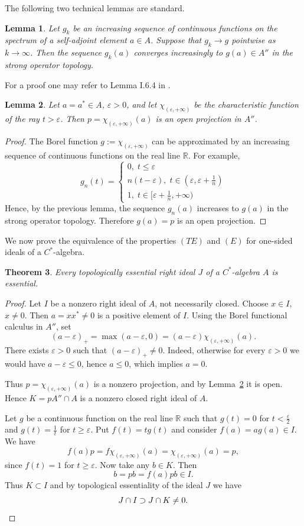\documentclass[reqno,a4paper,12pt]{amsart}
\theoremstyle{plain}
\newtheorem{theorem}{Theorem}[section]
\newtheorem{lemma}[theorem]{Lemma}
\theoremstyle{definition}
\newcommand{\RR}{\mathbb R}
\newcommand{\eps}{\varepsilon}
\renewcommand{\leq}{\leqslant}
\renewcommand{\geq}{\geqslant}
\begin{document}
	The following two technical lemmas are standard.
	\begin{lemma}
		Let $g_k$ be an increasing sequence of continuous functions on the spectrum of a self-adjoint element $a \in A$.
		Suppose that $g_k \to g$ pointwise as $k \to \infty$.
		Then the sequence $g_k(a)$ converges increasingly to $g(a) \in A''$ in the strong operator topology.
	\end{lemma}
	For a proof one may refer to Lemma I.6.4 in \cite{davidson}.
	\begin{lemma}
		\label{lem:proj}
		Let $a = a^* \in A$, $\eps > 0$, and let $\chi_{(\eps, +\infty)}$ be the characteristic function of the ray $t > \eps$.
		Then $p = \chi_{(\eps, +\infty)}(a)$ is an open projection in $A''$.
	\end{lemma}
	\begin{proof}
		The Borel function $g :=\chi_{(\eps, +\infty)}$ can be approximated by an increasing sequence of continuous functions on the real line $\RR$.
		For example,
		\[ g_n(t) = \begin{cases}
			0,\; t \leq \eps \\
			n(t - \eps),\; t \in (\eps, \eps + \frac 1n) \\
			1,\; t \in [\eps + \frac 1n, +\infty)
		\end{cases} \]
		Hence, by the previous lemma, the sequence $g_n(a)$ increases to $g(a)$ in the strong operator topology. Therefore $g(a) = p$ is an open projection.
	\end{proof}
	
	We now prove the equivalence of the properties $(TE)$ and $(E)$ for one-sided ideals of a $C^*$-algebra.
	\begin{theorem}
		\label{thm:main_ideals}
		Every topologically essential right ideal $J$ of a $C^*$-algebra $A$ is essential.
	\end{theorem}
	\begin{proof}
		Let $I$ be a nonzero right ideal of $A$, not necessarily closed. Choose $x \in I$, $x \ne 0$. Then $a = xx^* \ne 0$ is a positive element of $I$.
		Using the Borel functional calculus in $A''$, set
		\[ (a-\eps)_+ = \max(a-\eps, 0) = (a-\eps)\chi_{(\eps, +\infty)}(a). \]
		There exists $\eps > 0$ such that $(a-\eps)_+ \ne 0$.
		Indeed, otherwise for every $\eps > 0$ we would have $a-\eps \leq 0$, hence $a \leq 0$, which implies $a = 0$.
		
		Thus $p = \chi_{(\eps, +\infty)}(a)$ is a nonzero projection, and by Lemma~\ref{lem:proj} it is open. Hence $K=pA'' \cap A$ is a nonzero closed right ideal of $A$.
		
		Let $g$ be a continuous function on the real line $\RR$ such that $g(t) = 0$ for $t < \frac\eps 2$ and $g(t) = \frac1t$ for $t \geq \eps$.
		Put $f(t) = tg(t)$ and consider $f(a) = ag(a) \in I$. We have
		\[ f(a)p = f\chi_{(\eps, +\infty)}(a) = \chi_{(\eps, +\infty)}(a) = p, \]
		since $f(t) = 1$ for $t \geq \eps$.
		Now take any $b \in K$. Then
		\[ b = pb = f(a)pb \in I. \]
		Thus $K \subset I$ and by topological essentiality of the ideal $J$ we have
		\[ J \cap I \supset J \cap K \ne 0. \qedhere \]
	\end{proof}
	
\end{document}
